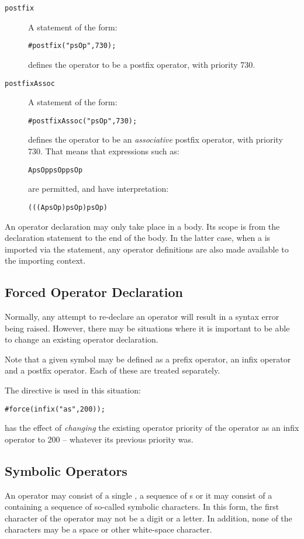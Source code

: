 \begin{description}
\item[\tt postfix]
A statement of the form:
\begin{alltt}
#postfix("psOp",730);
\end{alltt}
defines the operator  to be a postfix operator, with priority 730. 

\item[\tt postfixAssoc]
A statement of the form:
\begin{alltt}
#postfixAssoc("psOp",730);
\end{alltt}
defines the operator  to be an \emph{associative} postfix operator, with priority 730. That means that expressions such as:
\begin{alltt}
A psOp psOp psOp
\end{alltt}
are permitted, and have interpretation:
\begin{alltt}
(((A psOp) psOp) psOp)
\end{alltt}

\end{description}
An operator declaration may only take place in a  body. Its scope is from the declaration statement to the end of the  body. In the latter case, when a  is imported via the  statement, any operator definitions are also made available to the importing context.

\subsection{Forced Operator Declaration}
Normally, any attempt to re-declare an operator will result in a syntax error being raised. However, there may be situations where it is important to be able to change an existing operator declaration.
\begin{aside}
Note that a given symbol may be defined as a prefix operator, an infix operator and a postfix operator. Each of these are treated separately.
\end{aside}

The  directive is used in this situation:
\begin{alltt}
#force(infix("as",200));
\end{alltt}
has the effect of \emph{changing} the existing operator priority of the  operator as an infix operator to 200 -- whatever its previous priority was.

\subsection{Symbolic Operators}
\label{symbolicOperators}
An operator may consist of a single , a sequence of s or it may consist of a  containing a sequence of so-called symbolic characters. In this form, the first character of the operator may not be a digit or a letter. In addition, none of the characters may be a space or other white-space character.

